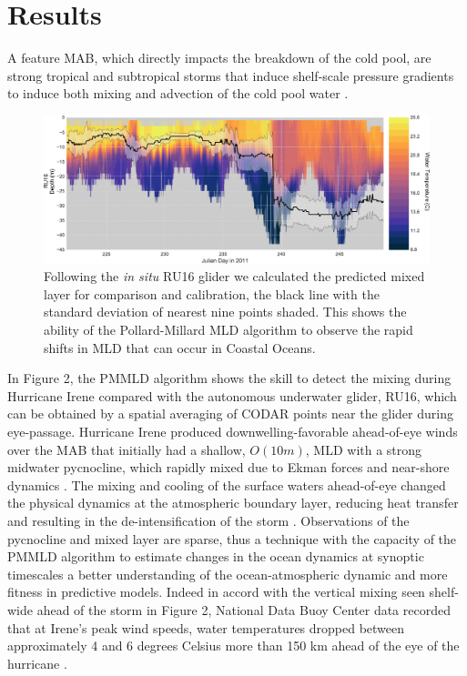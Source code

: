 \documentclass{article}
\begin{document}
\section*{Results}
A feature MAB, which directly impacts the breakdown of the cold pool, are strong tropical and subtropical storms that induce shelf-scale pressure gradients to induce both mixing and advection of the cold pool water \cite{Austin2002,Miles2013}.
\begin{figure}[h]
\caption{Following the \textit{in situ} RU16 glider we calculated the predicted mixed layer for comparison and calibration, the black line with the standard deviation of nearest nine points shaded. This shows the ability of the Pollard-Millard MLD algorithm to observe the rapid shifts in MLD that can occur in Coastal Oceans.}
\centering
\includegraphics[width=1.0\textwidth]{CodarVglider_Irene.pdf}
\end{figure}
In Figure 2, the PMMLD algorithm shows the skill to detect the mixing during Hurricane Irene compared with the autonomous underwater glider, RU16, which can be obtained by a spatial averaging of CODAR points near the glider during eye-passage. 
Hurricane Irene produced downwelling-favorable ahead-of-eye winds over the MAB that initially had a shallow, $O(10m)$, MLD with a strong midwater pycnocline, which rapidly mixed due to Ekman forces and near-shore dynamics \cite{Austin2002}.
The mixing and cooling of the surface waters ahead-of-eye changed the physical dynamics at the atmospheric boundary layer, reducing heat transfer and resulting in the de-intensification of the storm \cite{Seroka2016}. 
Observations of the pycnocline and mixed layer are sparse, thus a technique with the capacity of the PMMLD algorithm to estimate changes in the ocean dynamics at synoptic timescales a better understanding of the ocean-atmospheric dynamic and more fitness in predictive models.
Indeed in accord with the vertical mixing seen shelf-wide ahead of the storm in Figure 2, National Data Buoy Center data recorded that at Irene’s peak wind speeds, water temperatures dropped between approximately 4 and 6 degrees Celsius more than 150 km ahead of the eye of the hurricane \cite{Seroka2016}.
\end{document}
